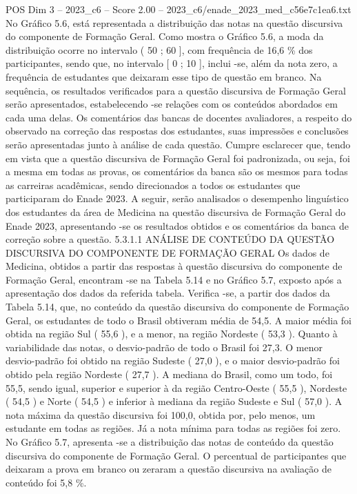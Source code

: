 \begin{textsample}{POS Dim 3 – 2023\_c6 – Score 2.00 – 2023\_c6/enade\_2023\_med\_c56e7c1ea6.txt}
No Gráfico 5.6, está representada a distribuição das notas na questão discursiva do componente de Formação Geral.
Como mostra o Gráfico 5.6, a moda da distribuição ocorre no intervalo ( 50 ; 60 ], com frequência de 16,6 \% dos participantes, sendo que, no intervalo [ 0 ; 10 ], inclui -se, além da nota zero, a frequência de estudantes que deixaram esse tipo de questão em branco.
Na sequência, os resultados verificados para a questão discursiva de Formação Geral serão apresentados, estabelecendo -se relações com os conteúdos abordados em cada uma delas.
Os comentários das bancas de docentes avaliadores, a respeito do observado na correção das respostas dos estudantes, suas impressões e conclusões serão apresentadas junto à análise de cada questão.
Cumpre esclarecer que, tendo em vista que a questão discursiva de Formação Geral foi padronizada, ou seja, foi a mesma em todas as provas, os comentários da banca são os mesmos para todas as carreiras acadêmicas, sendo direcionados a todos os estudantes que participaram do Enade 2023.
A seguir, serão analisados o desempenho linguístico dos estudantes da área de Medicina na questão discursiva de Formação Geral do Enade 2023, apresentando -se os resultados obtidos e os comentários da banca de correção sobre a questão. 5.3.1.1 ANÁLISE DE CONTEÚDO DA QUESTÃO DISCURSIVA DO COMPONENTE DE FORMAÇÃO GERAL Os dados de Medicina, obtidos a partir das respostas à questão discursiva do componente de Formação Geral, encontram -se na Tabela 5.14 e no Gráfico 5.7, exposto após a apresentação dos dados da referida tabela.
Verifica -se, a partir dos dados da Tabela 5.14, que, no conteúdo da questão discursiva do componente de Formação Geral, os estudantes de todo o Brasil obtiveram média de 54,5.
A maior média foi obtida na região Sul ( 55,6 ), e a menor, na região Nordeste ( 53,3 ).
Quanto à variabilidade das notas, o desvio-padrão de todo o Brasil foi 27,3.
O menor desvio-padrão foi obtido na região Sudeste ( 27,0 ), e o maior desvio-padrão foi obtido pela região Nordeste ( 27,7 ).
A mediana do Brasil, como um todo, foi 55,5, sendo igual, superior e superior à da região Centro-Oeste ( 55,5 ), Nordeste ( 54,5 ) e Norte ( 54,5 ) e inferior à mediana da região Sudeste e Sul ( 57,0 ).
A nota máxima da questão discursiva foi 100,0, obtida por, pelo menos, um estudante em todas as regiões.
Já a nota mínima para todas as regiões foi zero.
No Gráfico 5.7, apresenta -se a distribuição das notas de conteúdo da questão discursiva do componente de Formação Geral.
O percentual de participantes que deixaram a prova em branco ou zeraram a questão discursiva na avaliação de conteúdo foi 5,8 \%.

\end{textsample}
